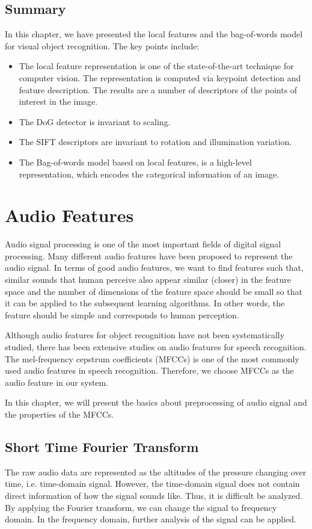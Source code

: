 \documentclass[12pt,final,twoside]{report}
\begin{document}
\section{Summary}
In this chapter, we have presented the local features and the bag-of-words model for visual object recognition. The key points include:
\begin{itemize}
  \item The local feature representation is one of the state-of-the-art technique for computer vision. The representation is computed via keypoint detection and feature description. The results are a number of descriptors of the points of interest in the image. 
  \item The DoG detector is invariant to scaling.
  \item The SIFT descriptors are invariant to rotation and illumination variation.
  \item The Bag-of-words model based on local features, is a high-level representation, which encodes the categorical information of an image. 
\end{itemize}

\cleardoublepage
\chapter{Audio Features}
\label{ch:audio}
Audio signal processing is one of the most important fields of digital signal processing. Many different audio features have been proposed to represent the audio signal. In terms of good audio features, we want to find features such that, similar sounds that human perceive also appear similar (closer) in the feature space and the number of dimensions of the feature space should be small so that it can be applied to the subsequent learning algorithms. In other words, the feature should be simple and corresponds to human perception.

Although audio features for object recognition have not been systematically studied, there has been extensive studies on audio features for speech recognition. The mel-frequency cepstrum coefficients (MFCCs) is one of the most commonly used audio features in speech recognition. Therefore, we choose MFCCs as the audio feature in our system.

In this chapter, we will present the basics about preprocessing of audio signal and the properties of the MFCCs.

\section{Short Time Fourier Transform}
The raw audio data are represented as the altitudes of the pressure changing over time, i.e. time-domain signal. However, the time-domain signal does not contain direct information of how the signal sounds like. Thus, it is difficult be analyzed. By applying the Fourier transform, we can change the signal to frequency domain. In the frequency domain, further analysis of the signal can be applied.
\end{document}
